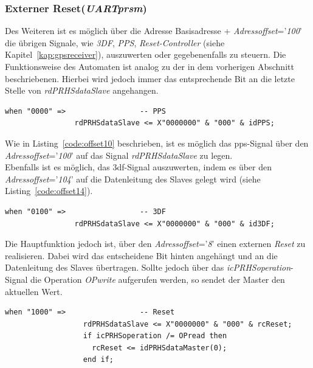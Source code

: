\subsubsection{Externer Reset(\emph{UARTprsm})}\label{kap:externerreset}


Des Weiteren ist es möglich über die Adresse Basisadresse + \emph{Adressoffset}='\emph{100}' die übrigen
Signale, wie \emph{3DF}, \emph{PPS}, \emph{Reset-Controller} (siehe Kapitel~\ref{kap:gpsreceiver}), auszuwerten
oder gegebenenfalls zu steuern. Die Funktionsweise des Automaten ist analog zu der in dem vorherigen Abschnitt beschriebenen.
Hierbei wird jedoch immer das entsprechende Bit an die letzte Stelle von \emph{rdPRHSdataSlave} angehangen.


\begin{lstlisting}[caption={Abfrage des \ac{pps}-Signals über \emph{Adressoffset}='\emph{100}'},label={code:offset10}]
              when "0000" =>                 -- PPS
                rdPRHSdataSlave <= X"0000000" & "000" & idPPS;
\end{lstlisting}

Wie in Listing~\ref{code:offset10} beschrieben, ist es möglich das \ac{pps}-Signal über den \emph{Adressoffset}='\emph{100}'
auf das Signal \emph{rdPRHSdataSlave} zu legen.\\
Ebenfalls ist es möglich, das \ac{3df}-Signal auszuwerten, indem es über den \emph{Adressoffset}='\emph{104}' auf die Datenleitung
des Slaves gelegt wird (siehe Listing~\ref{code:offset14}).\\


\begin{lstlisting}[caption={Abfrage des \ac{3df}-Signals über \emph{Adressoffset}='\emph{104}'},label={code:offset14}]
              when "0100" =>                 -- 3DF
                rdPRHSdataSlave <= X"0000000" & "000" & id3DF;
\end{lstlisting}

Die Hauptfunktion jedoch ist, über den \emph{Adressoffset}='\emph{8}' einen externen \emph{Reset} zu realisieren.
Dabei wird das entscheidene Bit hinten angehängt und an die Datenleitung des Slaves übertragen.
Sollte jedoch über das \emph{icPRHSoperation}-Signal die Operation \emph{OPwrite}
 aufgerufen werden, so sendet der Master den aktuellen Wert.\\


\begin{lstlisting}[caption={Lesen und Setzen des \emph{Reset}-Signals über \emph{Adressoffset}='\emph{108}'},label={code:offset18}]
                when "1000" =>                 -- Reset
                  rdPRHSdataSlave <= X"0000000" & "000" & rcReset;
                  if icPRHSoperation /= OPread then
                    rcReset <= idPRHSdataMaster(0);
                  end if;

\end{lstlisting}


